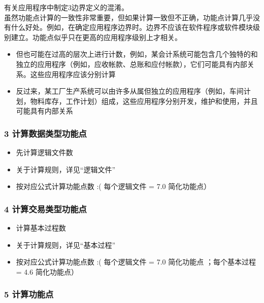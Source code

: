 有关应用程序中制定3边界定义的混淆。\\
虽然功能点计算的一致性非常重要，但如果计算一致但不正确，功能点计算几乎没有什么好处。例如，在确定应用程序边界时。边界不应该在软件程序或软件模块级别建立。功能点似乎只在更高的应用程序级别上才相关。

\begin{itemize}
\tightlist
\item
  但也可能在过高的层次上进行计数，例如，某会计系统可能包含几个独特的和独立的应用程序（例如，应收帐款、总账和应付帐款），它们可能具有内部关系。这些应用程序应该分别计算
\item
  反过来，某工厂生产系统可以由许多从属但独立的应用程序（例如，车间计划，物料库存，工作计划）组成，这些应用程序分别开发，维护和使用，并且可能具有内部关系
\end{itemize}

\hypertarget{ux8ba1ux7b97ux6570ux636eux7c7bux578bux529fux80fdux70b9}{%
\subsubsection{3
计算数据类型功能点}\label{ux8ba1ux7b97ux6570ux636eux7c7bux578bux529fux80fdux70b9}}

\begin{itemize}
\tightlist
\item
  先计算逻辑文件数
\item
  关于计算规则，详见``逻辑文件''
\item
  按对应公式计算功能点数 :( 每个逻辑文件 = 7.0 简化功能点）
\end{itemize}

\hypertarget{ux8ba1ux7b97ux4ea4ux6613ux7c7bux578bux529fux80fdux70b9}{%
\subsubsection{4
计算交易类型功能点}\label{ux8ba1ux7b97ux4ea4ux6613ux7c7bux578bux529fux80fdux70b9}}

\begin{itemize}
\tightlist
\item
  计算基本过程数
\item
  关于计算规则，详见``基本过程''
\item
  按对应公式计算功能点数 :( 每个逻辑文件 = 7.0 简化功能点 ；每个基本过程
  = 4.6 简化功能点）
\end{itemize}

\hypertarget{ux8ba1ux7b97ux529fux80fdux70b9}{%
\subsubsection{5 计算功能点}\label{ux8ba1ux7b97ux529fux80fdux70b9}}

